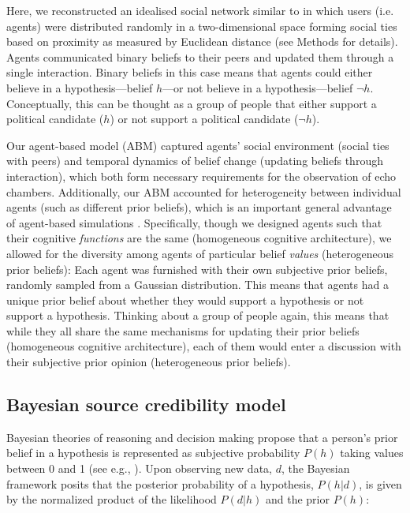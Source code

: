 \documentclass[fleqn,10pt]{wlscirep}
\begin{document}
Here, we reconstructed an idealised social network similar to \cite{pilditch2017opinion, madsen2018large} in which users (i.e. agents) were distributed randomly in a two-dimensional space forming social ties based on proximity as measured by Euclidean distance (see Methods for details). Agents communicated binary beliefs to their peers and updated them through a single interaction. Binary beliefs in this case means that agents could either believe in a hypothesis---belief \(h\)---or not believe in a hypothesis---belief \(\neg h\). Conceptually, this can be thought as a group of people that either support a political candidate (\(h\)) or not support a political candidate (\(\neg h\)). 

Our agent-based model (ABM) captured agents' social environment (social ties with peers) and temporal dynamics of belief change (updating beliefs through interaction), which both form necessary requirements for the observation of echo chambers. Additionally, our ABM accounted for heterogeneity between individual agents (such as different prior beliefs), which is an important general advantage of agent-based simulations \cite{wilensky2015introduction}. Specifically, though we designed agents such that their cognitive \textit{functions} are the same (homogeneous cognitive architecture), we allowed for the diversity among agents of particular belief \textit{values} (heterogeneous prior beliefs): Each agent was furnished with their own subjective prior beliefs, randomly sampled from a Gaussian distribution. This means that agents had a unique prior belief about whether they would support a hypothesis or not support a hypothesis. Thinking about a group of people again, this means that while they all share the same mechanisms for updating their prior beliefs (homogeneous cognitive architecture), each of them would enter a discussion with their subjective prior opinion (heterogeneous prior beliefs).

\subsection*{Bayesian source credibility model}
Bayesian theories of reasoning and decision making propose that a person's prior belief in a hypothesis is represented as subjective probability \(P(h)\) taking values between 0 and 1 (see e.g., \cite{hahn2007rationality, oaksford2007bayesian}). Upon observing new data, \(d\), the Bayesian framework posits that the posterior probability of a hypothesis, \(P(h|d)\), is given by the normalized product of the likelihood \(P(d|h)\) and the prior \(P(h)\):
\end{document}
